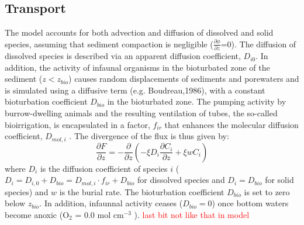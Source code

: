 \documentclass[gmd, manuscript]{copernicus}
\begin{document}
\subsection{Transport}\label{subsec:Transport}
The model accounts for both advection and diffusion of dissolved and solid species, assuming that sediment compaction is negligible ($\frac{\partial \phi}{\partial z}$=0). 
The diffusion of dissolved species is described via an apparent diffusion coefficient, $D_{i0}$. In addition, the activity of infaunal organisms in the bioturbated zone of the sediment ($z<z_{bio}$) causes random 
displacements of sediments and porewaters and is simulated using a diffusive term (e.g. Boudreau,1986), with a constant bioturbation coefficient $D_{bio}$ in the bioturbated zone. 
The pumping activity by burrow-dwelling animals and the resulting ventilation of tubes, the so-called bioirrigation, is encapsulated in a factor, $f_{ir}$ that enhances the molecular diffusion coefficient, 
$D_{mol,i}$ \citep[ hence, $D_{i,0}=D_{mol,i}\cdot f_{ir}$,][]{soetaert1996dynamic}.  The divergence of the flux is thus given by:
\begin{equation}
\frac{\partial F}{\partial z}=-\frac{\partial}{\partial z}\left( -\xi D_i \frac{\partial C_i}{\partial z} +\xi w C_i\right) \label{Eq_flux_divergence}
\end{equation}
where $D_i$ is the diffusion coefficient of species $i$ ($D_i=D_{i,0}+D_{bio}=D_{mol,i}\cdot f_{ir}+D_{bio}$ for dissolved species and $D_i=D_{bio}$ for solid species) and $w$ is the burial rate. 
The bioturbation coefficient $D_{bio}$ is set to zero below $z_{bio}$. In addition, infaunnal activity ceases ($D_{bio}=0$) once bottom waters become anoxic (O$_2$ = 0.0 mol cm$^{-3}$ ). 
\textcolor{red}{last bit not like that in model}
\end{document}
